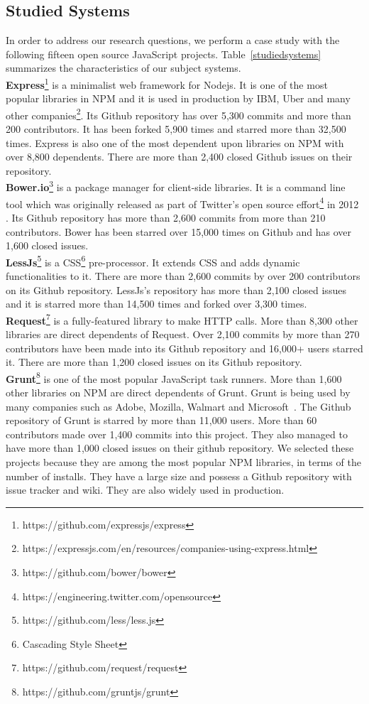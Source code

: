 \subsection{Studied Systems}
In order to address our research questions, we perform a case study with the following {\color{blue}fifteen} open source JavaScript projects. Table~\ref{studiedsystems} summarizes the characteristics of our subject systems.\\
\textbf{Express}\footnote{https://github.com/expressjs/express} is a minimalist web framework for Nodejs. It is one of the most popular libraries in NPM \cite{mardan2014express} and it is used in production by IBM, Uber and many other companies\footnote{https://expressjs.com/en/resources/companies-using-express.html}. Its Github repository has over 5,300 commits and more than 200 contributors. It has been forked 5,900 times and starred more than 32,500 times. Express is also one of the most dependent upon libraries on NPM with over 8,800 dependents. There are more than 2,400 closed Github issues on their repository.\\
\textbf{Bower.io}\footnote{https://github.com/bower/bower} is a package manager for client-side libraries.
It is a command line tool which was originally released as part of Twitter's open source effort\footnote{https://engineering.twitter.com/opensource} in 2012 \cite{bowerabout}. Its Github repository has more than 2,600 commits from more than 210 contributors. Bower has been starred over 15,000 times on Github and has over 1,600 closed issues.\\ \textbf{LessJs}\footnote{https://github.com/less/less.js} is a CSS\footnote{Cascading Style Sheet} pre-processor. It extends CSS and adds dynamic functionalities to it. There are more than 2,600 commits by over 200 contributors on its Github repository. LessJs's repository has more than 2,100 closed issues and it is starred more than 14,500 times and forked over 3,300 times.\\ \textbf{Request}\footnote{https://github.com/request/request} is a fully-featured library to make HTTP calls. More than 8,300 other libraries are direct dependents of Request. Over 2,100 commits by more than 270 contributors have been made into its Github repository and 16,000+ users starred it. There are more than 1,200 closed issues on its Github repository.\\ \textbf{Grunt}\footnote{https://github.com/gruntjs/grunt} is one of the most popular JavaScript task runners. More than 1,600 other libraries on NPM are direct dependents of Grunt. Grunt is being used by many companies such as Adobe, Mozilla, Walmart and Microsoft~\cite{gruntusers}. The Github repository of Grunt is starred by more than 11,000 users. More than 60 contributors made over 1,400 commits into this project. They also managed to have more than 1,000 closed issues on their github repository. We selected these projects because they are among the most popular NPM libraries, in terms of the number of installs. They have a large size and possess a Github repository with issue tracker and wiki. They are also widely used in production.\\
